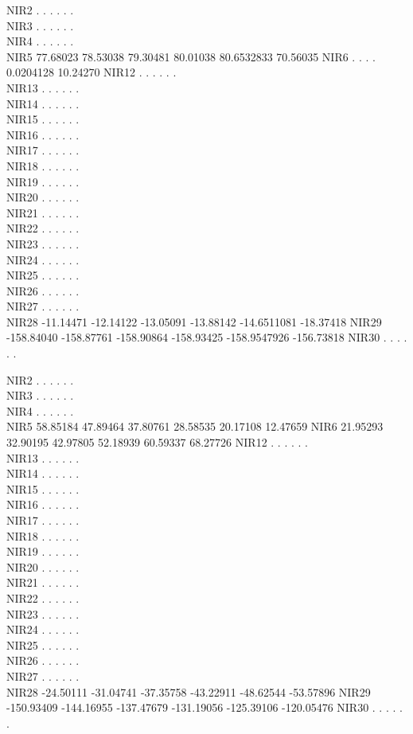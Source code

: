 \documentclass[
]{article}
\begin{document}
NIR2 . . . . . .\\
NIR3 . . . . . .\\
NIR4 . . . . . .\\
NIR5 77.68023 78.53038 79.30481 80.01038 80.6532833 70.56035 NIR6 . . .
. 0.0204128 10.24270 NIR12 . . . . . .\\
NIR13 . . . . . .\\
NIR14 . . . . . .\\
NIR15 . . . . . .\\
NIR16 . . . . . .\\
NIR17 . . . . . .\\
NIR18 . . . . . .\\
NIR19 . . . . . .\\
NIR20 . . . . . .\\
NIR21 . . . . . .\\
NIR22 . . . . . .\\
NIR23 . . . . . .\\
NIR24 . . . . . .\\
NIR25 . . . . . .\\
NIR26 . . . . . .\\
NIR27 . . . . . .\\
NIR28 -11.14471 -12.14122 -13.05091 -13.88142 -14.6511081 -18.37418
NIR29 -158.84040 -158.87761 -158.90864 -158.93425 -158.9547926
-156.73818 NIR30 . . . . . .

NIR2 . . . . . .\\
NIR3 . . . . . .\\
NIR4 . . . . . .\\
NIR5 58.85184 47.89464 37.80761 28.58535 20.17108 12.47659 NIR6 21.95293
32.90195 42.97805 52.18939 60.59337 68.27726 NIR12 . . . . . .\\
NIR13 . . . . . .\\
NIR14 . . . . . .\\
NIR15 . . . . . .\\
NIR16 . . . . . .\\
NIR17 . . . . . .\\
NIR18 . . . . . .\\
NIR19 . . . . . .\\
NIR20 . . . . . .\\
NIR21 . . . . . .\\
NIR22 . . . . . .\\
NIR23 . . . . . .\\
NIR24 . . . . . .\\
NIR25 . . . . . .\\
NIR26 . . . . . .\\
NIR27 . . . . . .\\
NIR28 -24.50111 -31.04741 -37.35758 -43.22911 -48.62544 -53.57896 NIR29
-150.93409 -144.16955 -137.47679 -131.19056 -125.39106 -120.05476 NIR30
. . . . . .
\end{document}
